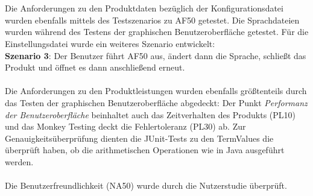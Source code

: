 \documentclass[parskip=full]{scrartcl}
\begin{document}
\\
 \\
Die Anforderungen zu den Produktdaten bezüglich der Konfigurationsdatei wurden ebenfalls mittels des Testszenarios zu AF50 getestet. Die Sprachdateien wurden während des Testens der graphischen Benutzeroberfläche getestet. Für die Einstellungsdatei wurde ein weiteres Szenario entwickelt: \\
\textbf{Szenario 3}: Der Benutzer führt AF50 aus, ändert dann die Sprache, schließt das Produkt und öffnet es dann anschließend erneut. \\
 \\
Die Anforderungen zu den Produktleistungen wurden ebenfalls größtenteils durch das Testen der graphischen Benutzeroberfläche abgedeckt: Der Punkt \textit{Performanz der Benutzeroberfläche} beinhaltet auch das Zeitverhalten des Produkts (PL10) und das Monkey Testing deckt die Fehlertoleranz (PL30) ab. Zur Genauigkeitsüberprüfung dienten die JUnit-Tests zu den TermValues die überprüft haben, ob die arithmetischen Operationen wie in Java ausgeführt werden. \\
 \\
Die Benutzerfreundlichkeit (NA50) wurde durch die Nutzerstudie überprüft. 
\end{document}

